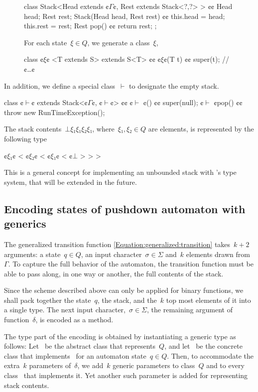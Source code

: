 \begin{figure}[H]
\begin{JAVA}
class Stack<Head extends ¢$Γ$¢, Rest extends Stack<?,?> > {¢¢
  Head head;
  Rest rest;
  Stack(Head head, Rest rest) {¢¢ this.head = head; this.rest = rest;}
  Rest pop() {¢¢ return rest; };
}
\end{JAVA}
For each state~$ξ∈Q$, we generate a \Java class~$ξ$,
\begin{JAVA}
class ¢$ξ$¢ <T extends S> extends S<T> {¢¢
  ¢$ξ$¢(T t) {¢¢ super(t); }
  // ¢…¢
}
\end{JAVA}
\end{figure}
In addition, we define a special class~$\vdash$ to designate the empty stack.
\begin{JAVA}
class ¢$\vdash$¢ extends Stack<¢$Γ$¢, ¢$\vdash$¢> {¢¢
  ¢$\vdash$ ¢() {¢¢ super(null); }
  ¢$\vdash$ ¢pop() {¢¢ throw new RunTimeException(); }
}
\end{JAVA}
The stack contents~$⊥ξ₁ξ₁ξ₂ξ₁$,
where~$ξ₁,ξ₂∈Q$ are elements,
is represented by the following type
\begin{JAVA}
  ¢$ξ₁$¢ < ¢$ξ₂$¢ < ¢$ξ₁$¢ < ¢$⊥$ > > >
\end{JAVA}
This is a general concept for implementing an unbounded stack with \Java's type system,
that will be extended in the future.

\subsection{Encoding states of pushdown automaton with \Java generics}
The generalized transition function \cref{Equation:generalized:transition}
  takes~$k+2$ arguments: a state~$q∈Q$, an input character~$σ∈Σ$
    and~$k$ elements drawn from~$Γ$.
To capture the full behavior of the automaton, the transition function
  must be able to pass along, in one way or another, the full contents of the stack.

Since the scheme described above can only be applied for binary functions,
  we shall pack together the state~$q$, the stack, and the~$k$ top most
  elements of it into a single type.
The next input character,~$σ∈Σ$, the remaining argument of function~$δ$,
  is encoded as a method.

The type part of the encoding is obtained by instantiating a generic type as follows:
Let~ be the abstract class that represents~$Q$, and let~ be the concrete class that
  implements~ for an automaton state~$q∈Q$.
Then, to accommodate the extra~$k$ parameters of~$δ$, we add~$k$ generic parameters
  to class~$Q$ and to every class~ that implements it.
Yet another such parameter is added for representing stack contents.

